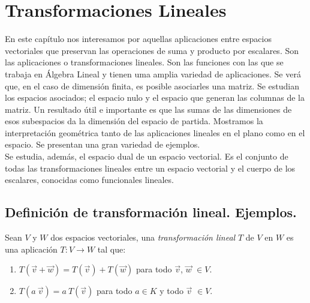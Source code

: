 
\chapter{Transformaciones Lineales}

En este capítulo nos interesamos por aquellas aplicaciones entre espacios vectoriales que preservan las operaciones de suma y producto por escalares. Son las aplicaciones o transformaciones lineales. Son las funciones con las que se trabaja en Álgebra Lineal y tienen uma amplia variedad de aplicaciones.  Se verá que, en el caso de dimensión finita,  es posible  asociarles una matriz. Se estudian los espacios asociados; el espacio nulo y el espacio que generan las columnas de la matriz. Un resultado útil e importante es que las sumas de las dimensiones de esos subespacios da la dimensión del espacio de partida. Mostramos la interpretación geométrica tanto de las aplicaciones lineales en el plano como en el espacio. Se presentan una gran variedad de ejemplos.\\
Se  estudia, además, el espacio dual de un espacio vectorial. Es el conjunto de todas las transformaciones lineales entre un espacio vectorial y el cuerpo de los escalares, conocidas como funcionales lineales. 

\section{Definición de transformación lineal. Ejemplos.}

\bigskip

\begin{definition}\label{TL}


Sean $V$ y $W$ dos espacios vectoriales, una \textit{transformación lineal} $T$ de $V$ en $W$ es una aplicación $T: V \rightarrow W$ tal que: 


\bigskip

\begin{enumerate}

\item $T(\vec{v}+\vec{w})=T(\vec{v})+T(\vec{w})$ para todo  $\vec{v}$, $\vec{w}$ $\in V$.

\item $T(a ~\vec{v})=a~T(\vec{v})$ para todo $a\in K$ y todo $\vec{v}$ $\in V$.
  

\end{enumerate}

\end{definition}

